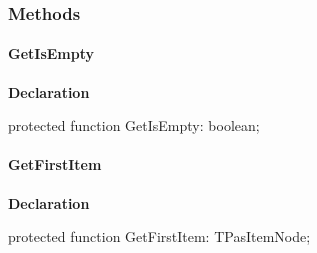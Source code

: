 \documentclass{report}
\newif\ifpdf
\begin{document}
\subsubsection*{\large{\textbf{Methods}}\normalsize\hspace{1ex}\hfill}
\paragraph*{GetIsEmpty}\hspace*{\fill}

\label{PasDoc_HierarchyTree.TStringCardinalTree-GetIsEmpty}
\begin{list}{}{
\setlength{\itemindent}{0cm}
\setlength{\listparindent}{0cm}
\setlength{\leftmargin}{\evensidemargin}
\addtolength{\leftmargin}{\tmplength}
\settowidth{\labelsep}{X}
\addtolength{\leftmargin}{\labelsep}
\setlength{\labelwidth}{\tmplength}
}
\item[\textbf{Declaration}\hfill]
\ifpdf
\begin{flushleft}
\fi
\begin{ttfamily}
protected function GetIsEmpty: boolean;\end{ttfamily}

\ifpdf
\end{flushleft}
\fi

\end{list}
\paragraph*{GetFirstItem}\hspace*{\fill}

\label{PasDoc_HierarchyTree.TStringCardinalTree-GetFirstItem}
\begin{list}{}{
\setlength{\itemindent}{0cm}
\setlength{\listparindent}{0cm}
\setlength{\leftmargin}{\evensidemargin}
\addtolength{\leftmargin}{\tmplength}
\settowidth{\labelsep}{X}
\addtolength{\leftmargin}{\labelsep}
\setlength{\labelwidth}{\tmplength}
}
\item[\textbf{Declaration}\hfill]
\ifpdf
\begin{flushleft}
\fi
\begin{ttfamily}
protected function GetFirstItem: TPasItemNode;\end{ttfamily}

\ifpdf
\end{flushleft}
\fi

\end{list}
\end{document}
